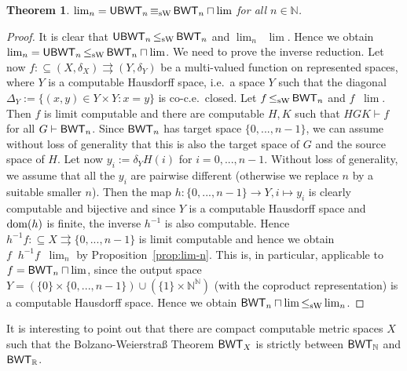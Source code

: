 \documentclass[a4paper]{amsart}
\def\IN{{\mathbb{N}}}
\def\IR{{\mathbb{R}}}
\def\In{\subseteq}
\def\mto{\rightrightarrows}
\def\dom{{\rm dom}}
\def\Baire{{\IN^\IN}}
\def\BWT{\text{\rm\sffamily BWT}}
\def\UBWT{\text{\rm\sffamily UBWT}}
\def\leqSW{\mathop{\leq_{\mathrm{sW}}}}
\def\equivSW{\mathop{\equiv_{\mathrm{sW}}}}
\newtheorem{theorem}{Theorem}[section]
\theoremstyle{definition}
\begin{document}
\begin{theorem}
$\lim_n=\UBWT_n\equivSW\BWT_n\sqcap\lim$ for all $n\in\IN$.
\end{theorem}
\begin{proof}
It is clear that $\UBWT_n\leqSW\BWT_n$ and $\lim_n\leqSW\lim$.
Hence we obtain $\lim_n=\UBWT_n\leqSW\BWT_n\sqcap\lim$.
We need to prove the inverse reduction.
Let now $f:\In (X,\delta_X)\mto(Y,\delta_Y)$ be a multi-valued function on represented spaces,
where $Y$ is a computable Hausdorff space, i.e.\ a space $Y$ such that 
the diagonal $\Delta_Y:=\{(x,y)\in Y\times Y:x=y\}$ is co-c.e.\ closed.
Let $f\leqSW\BWT_n$ and $f\leqSW\lim$. 
Then $f$ is limit computable and there are computable $H,K$ such that $HGK\vdash f$ for all $G\vdash\BWT_n$.
Since $\BWT_n$ has target space $\{0,...,n-1\}$, we can assume without 
loss of generality that this is also the target space of $G$ and the source space of $H$. 
Let now $y_i:=\delta_YH(i)$ for $i=0,...,n-1$. 
Without loss of generality, we assume that all the $y_i$ are pairwise different (otherwise
we replace $n$ by a suitable smaller $n$).
Then the map $h:\{0,...,n-1\}\to Y,i\mapsto y_i$ is clearly computable and bijective and
since $Y$ is a computable Hausdorff space and $\dom(h)$ is finite, the inverse $h^{-1}$ is also computable. 
Hence $h^{-1}f:\In X\mto\{0,...,n-1\}$ is limit computable and hence we obtain 
$f\equivSW h^{-1}f\leqSW\lim_n$ by Proposition~\ref{prop:lim-n}. 
This is, in particular, applicable to $f=\BWT_n\sqcap\lim$, since the output space
$Y=(\{0\}\times\{0,...,n-1\})\cup(\{1\}\times\Baire)$ (with the coproduct representation)
is a computable Hausdorff space.
Hence we obtain $\BWT_n\sqcap\lim\leqSW\lim_n$.
\end{proof}

It is interesting to point out that there are compact computable
metric spaces $X$ such that the Bolzano-Weierstra\ss{} Theorem
$\BWT_X$ is strictly between $\BWT_\IN$ and $\BWT_\IR$.
\end{document}
